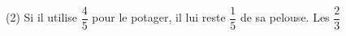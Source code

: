 %
%
    \begin{tasks}(2)
        \task Si il utilise $\dfrac{4}{5}$ pour le potager, il lui reste
        $\dfrac{1}{5}$ de sa pelouse.
        \task Les $\dfrac{2}{3}$
    \end{tasks}
